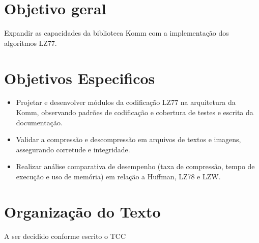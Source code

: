 \section{Objetivo geral}
Expandir as capacidades da biblioteca Komm com a implementação dos algoritmos
LZ77.

\section{Objetivos Especificos}
\begin{itemize}
    \item  Projetar e desenvolver módulos da codificação LZ77 na arquitetura da Komm,
          observando padrões de codificação e cobertura de testes e escrita da
          documentação.

    \item Validar a compressão e descompressão em arquivos de textos e imagens,
          assegurando corretude e integridade.

    \item Realizar análise comparativa de desempenho (taxa de compressão, tempo de
          execução e uso de memória) em relação a Huffman, LZ78 e LZW.

\end{itemize}
\section{Organização do Texto}
A ser decidido conforme escrito o TCC